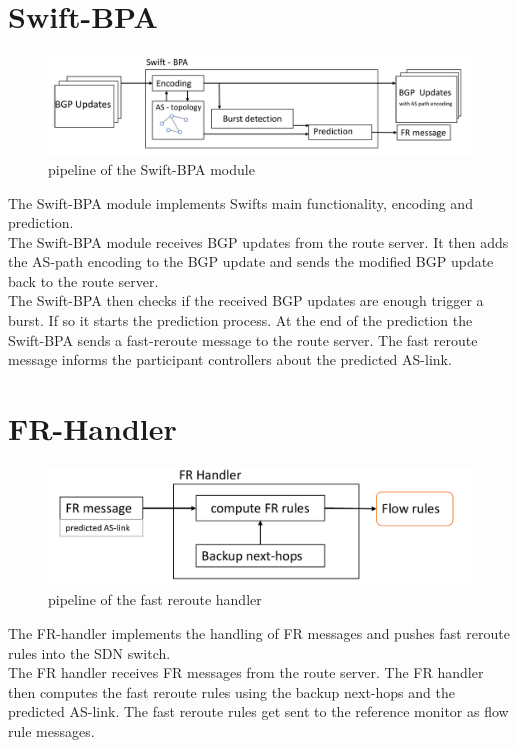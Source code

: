 \section{\label{chapter3:Swift-BPA}Swift-BPA}

\begin{figure}[h]
\center
\includegraphics[scale = 0.5]{Figures/design_swift_bpa_cropped.pdf}
\caption{pipeline of the Swift-BPA module}
\end{figure}

The Swift-BPA module implements Swifts main functionality, encoding and prediction. \\
The Swift-BPA module receives BGP updates from the route server. It then adds the AS-path encoding to the BGP update and sends the modified BGP update back to the route server. \\
The Swift-BPA then checks if the received BGP updates are enough trigger a burst. If so it starts the prediction process. At the end of the prediction the Swift-BPA sends a fast-reroute message to the route server. The fast reroute message informs the participant controllers about the predicted AS-link. \\

\section{\label{chapter3:FR-handler}FR-Handler}

\begin{figure}[h]
\center
\includegraphics[scale = 0.6]{Figures/design_fr_handler_cropped.pdf}
\caption{pipeline of the fast reroute handler}
\end{figure}

The FR-handler implements the handling of FR messages and pushes fast reroute rules into the SDN switch. \\
The FR handler receives FR messages from the route server. The FR handler then computes the fast reroute rules using the backup next-hops and the predicted AS-link. The fast reroute rules get sent to the reference monitor as flow rule messages.  

